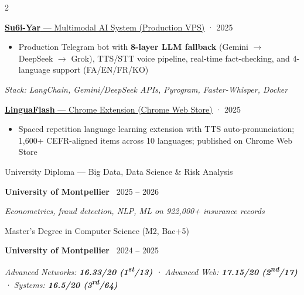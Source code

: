 \documentclass[7pt,a4paper,withhyper]{altacv}
\renewcommand{\cvevent}[4]{%
  {\large\color{emphasis}\raggedright #1\par}
  \smallskip\normalsize
  \ifstrequal{#2}{}{}{%
    \textbf{\color{accent}#2}%
  }%
  \ifstrequal{#4}{}{}{%
    \ifstrequal{#2}{}{}{\hspace{1.5em}}%
    {\small\cvLocationMarker~#4}%
  }%
  \ifstrequal{#3}{}{}{%
    \hfill{\small\cvDateMarker~#3}%
  }\par
}
\providecommand{\cvgithub}{github-username}
\begin{document}
\begin{paracol}{2}
{\large\color{emphasis}\raggedright\href{https://github.com/\cvgithub/su6i-yar}{\textbf{Su6i-Yar} — Multimodal AI System (Production VPS)} {\small\color{LightGrey}· 2025}\par}
\vspace{0.1em}
\begin{itemize}[leftmargin=1.25em, nosep]
\item \justifying Production Telegram bot with \textbf{8-layer LLM fallback} (Gemini $\to$ DeepSeek $\to$ Grok), TTS/STT voice pipeline, real-time fact-checking, and 4-language support (FA/EN/FR/KO)
\end{itemize}
\noindent\textit{\small Stack: LangChain, Gemini/DeepSeek APIs, Pyrogram, Faster-Whisper, Docker}\par
\vspace{0.1em}\par\vspace{0.1em}

{\large\color{emphasis}\raggedright\href{https://github.com/\cvgithub/LinguaFlash}{\textbf{LinguaFlash} — Chrome Extension (Chrome Web Store)} {\small\color{LightGrey}· 2025}\par}
\vspace{0.1em}
\begin{itemize}[leftmargin=1.25em, nosep]
\item \justifying Spaced repetition language learning extension with TTS auto-pronunciation; 1,600+ CEFR-aligned items across 10 languages; published on Chrome Web Store
\end{itemize}\par

\vspace{-0.5ex}

\cvevent{University Diploma — Big Data, Data Science \& Risk Analysis}{University of Montpellier}{2025 – 2026}{}
\textit{Econometrics, fraud detection, NLP, ML on 922,000+ insurance records}\par

\vspace{0.1em}\par\vspace{0.1em}

\cvevent{Master's Degree in Computer Science (M2, Bac+5)}{University of Montpellier}{2024 – 2025}{}
\textit{Advanced Networks: \textbf{16.33/20 (1\textsuperscript{st}/13)} · Advanced Web: \textbf{17.15/20 (2\textsuperscript{nd}/17)} · Systems: \textbf{16.5/20 (3\textsuperscript{rd}/64)}}\par

\end{paracol}
\end{document}
